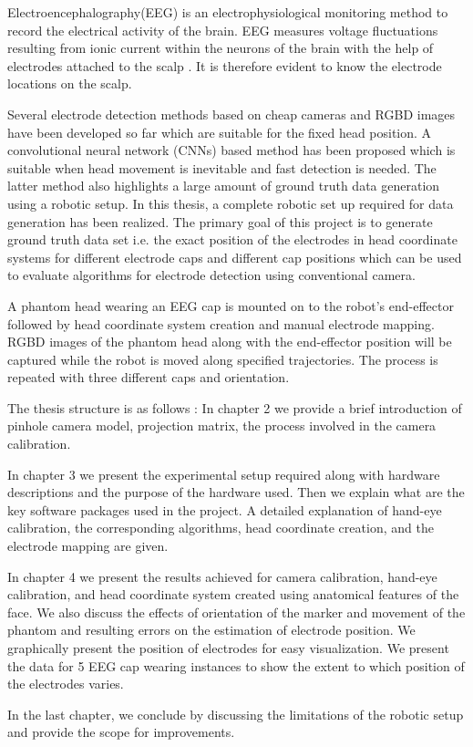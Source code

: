 Electroencephalography(EEG) is an electrophysiological monitoring method to record the electrical activity of the brain. EEG measures voltage fluctuations resulting from ionic current within the neurons of the brain with the help of electrodes attached to the scalp \cite{EEG}. It is therefore evident to know the electrode locations on the scalp.

Several electrode detection methods based on cheap cameras and RGBD images have been developed so far \cite{ASingleCameraPhotogrammetry} \cite{Reis2015UsingAM} which are suitable for the fixed head position. A convolutional neural network (CNNs) based method has been proposed \cite{2019arXiv190804186G} which is suitable when head movement is inevitable and fast detection is needed. The latter method also highlights a large amount of ground truth data generation using a robotic setup. In this thesis, a complete robotic set up required for data generation has been realized. The primary goal of this project is to generate ground truth data set i.e. the exact position of the electrodes in head coordinate systems for different electrode caps and different cap positions which can be used to evaluate algorithms for electrode detection using conventional camera.

A phantom head wearing an EEG cap is mounted on to the robot's end-effector followed by head coordinate system creation and manual electrode mapping. RGBD images of the phantom head along with the end-effector position will be captured while the robot is moved along specified trajectories. The process is repeated with three different caps and orientation.

The thesis structure is as follows : In chapter 2 we provide a brief introduction of pinhole camera model, projection matrix, the process involved in the camera calibration.

In chapter 3 we present the experimental setup required along with hardware descriptions and the purpose of the hardware used. Then we explain what are the key software packages used in the project. A detailed explanation of hand-eye calibration, the corresponding algorithms, head coordinate creation, and the electrode mapping are given.

In chapter 4 we present the results achieved for camera calibration, hand-eye calibration, and head coordinate system created using anatomical features of the face. 
We also discuss the effects of orientation of the marker and movement of the phantom and resulting errors on the estimation of electrode position. We graphically present the position of electrodes for easy visualization. We present the data for 5 EEG cap wearing instances to show the extent to which position of the electrodes varies. 

In the last chapter, we conclude by discussing the limitations of the robotic setup and provide the scope for improvements.